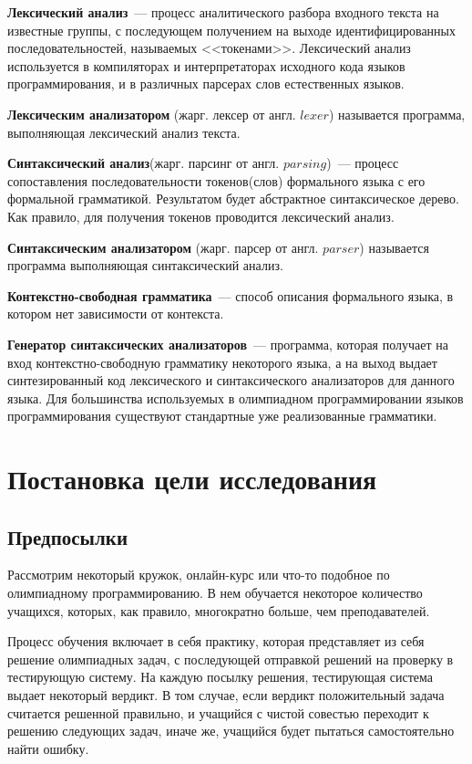 \textbf{Лексический анализ}~--- процесс аналитического разбора 
входного текста на известные группы, с последующем получением на выходе 
идентифицированных последовательностей, называемых <<токенами>>. 
Лексический анализ используется в компиляторах и интерпретаторах исходного кода языков программирования, 
и в различных парсерах слов естественных языков.

\textbf{Лексическим анализатором} (жарг. лексер от англ. $lexer$) называется программа, выполняющая лексический анализ текста.

\textbf{Синтаксический анализ}(жарг. парсинг от англ. $parsing$)~--- процесс сопоставления последовательности токенов(слов)
формального языка с его формальной грамматикой. Результатом будет абстрактное синтаксическое дерево. Как правило, для получения
токенов проводится лексический анализ.

\textbf{Синтаксическим анализатором} (жарг. парсер от англ. $parser$) называется программа выполняющая синтаксический анализ.

\textbf{Контекстно-свободная грамматика}~---  способ описания формального языка, в котором нет зависимости от контекста.

\textbf{Генератор синтаксических анализаторов}~--- программа, которая получает на вход контекстно-свободную грамматику 
некоторого языка, а на выход выдает синтезированный код лексического и синтаксического анализаторов для данного языка.
Для большинства используемых в олимпиадном программировании языков программирования 
существуют стандартные уже реализованные грамматики.

\section{Постановка цели исследования}
\subsection{Предпосылки}

Рассмотрим некоторый кружок, онлайн-курс или что-то подобное по олимпиадному программированию. 
В нем обучается некоторое количество учащихся, которых, как правило, многократно больше, чем преподавателей.

Процесс обучения включает в себя практику, которая представляет из себя решение олимпиадных задач, с последующей
отправкой решений на проверку в тестирующую систему. На каждую посылку решения, тестирующая система выдает некоторый вердикт.
В том случае, если вердикт положительный задача считается решенной правильно, и учащийся с чистой совестью переходит к решению
следующих задач, иначе же, учащийся будет пытаться самостоятельно найти ошибку.

